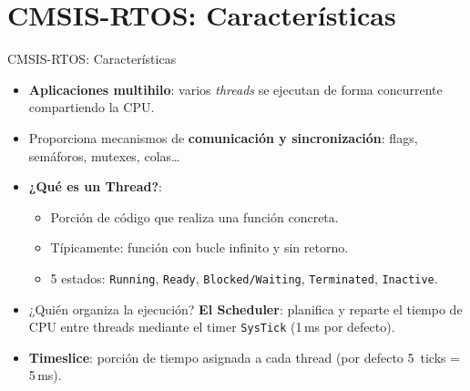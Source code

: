 \section[Características]{CMSIS-RTOS: Características}

\begin{frame}{CMSIS-RTOS: Características}
    \begin{itemize}
        \item \textbf{Aplicaciones multihilo}: varios \emph{threads} se
              ejecutan de forma concurrente compartiendo la CPU.
        \item Proporciona mecanismos de \textbf{comunicación y
              sincronización}: flags, semáforos, mutexes, colas\ldots
        \item \textbf{¿Qué es un Thread?}:
            \begin{itemize}
                \item Porción de código que realiza una función concreta.
                \item Típicamente: función con bucle infinito y sin retorno.
                \item 5 estados: \texttt{Running}, \texttt{Ready},
                      \texttt{Blocked/Waiting}, \texttt{Terminated},
                      \texttt{Inactive}.
            \end{itemize}
        \item ¿Quién organiza la ejecución? \textbf{El Scheduler}: planifica y reparte el tiempo de CPU              entre threads mediante el timer \texttt{SysTick} (1\,ms por defecto).
        \item \textbf{Timeslice}: porción de tiempo asignada a cada thread
              (por defecto 5~ticks = 5\,ms).
    \end{itemize}
\end{frame}

